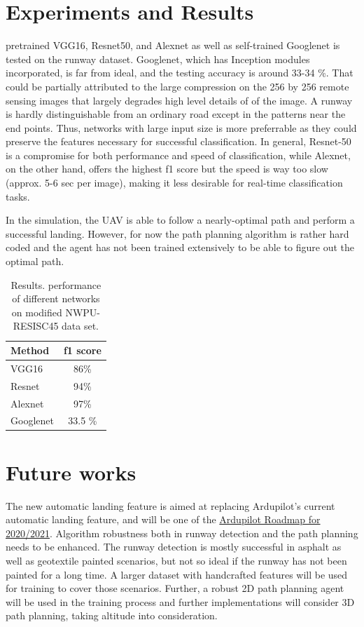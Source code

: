 \documentclass[10pt,twocolumn,letterpaper]{article}
\begin{document}
\section{Experiments and Results}
pretrained VGG16, Resnet50, and Alexnet as well as self-trained Googlenet is tested on the runway dataset. Googlenet, which has Inception modules incorporated, is far from ideal, and the testing accuracy is around 33-34 \%. That could be partially attributed to the large compression on the 256 by 256 remote sensing images that largely degrades high level details of of the image. A runway is hardly distinguishable from an ordinary road except in the patterns near the end points. Thus, networks with large input size is more preferrable as they could preserve the features necessary for successful classification. In general, Resnet-50 is a compromise for both performance and speed of classification, while Alexnet, on the other hand, offers the highest f1 score but the speed is way too slow (approx. 5-6 sec per image), making it less desirable for real-time classification tasks.



In the simulation, the UAV is able to follow a nearly-optimal path and perform a successful landing. However, for now the path planning algorithm is rather hard coded and the agent has not been trained extensively to be able to figure out the optimal path. 

\begin{table}
\begin{center}
\begin{tabular}{|l|c|}
\hline
Method & f1 score\\
\hline\hline
VGG16 & 86\% \\
Resnet & 94\% \\
Alexnet & 97\%\\
Googlenet & 33.5 \%\\
\hline
\end{tabular}
\end{center}
\caption{Results.   performance of different networks on modified NWPU-RESISC45 data set.}
\end{table}

\section{Future works}
The new automatic landing feature is aimed at replacing Ardupilot's current automatic landing feature, and will be one of the \href{https://ardupilot.org/dev/docs/roadmap.html}{Ardupilot Roadmap for 2020/2021}. Algorithm robustness both in runway detection and the path planning needs to be enhanced. The runway detection is mostly successful in asphalt as well as geotextile painted scenarios, but not so ideal if the runway has not been painted for a long time. A larger dataset with handcrafted features will be used for training to cover those scenarios. Further, a robust 2D path planning agent will be used in the training process and further implementations will consider 3D path planning, taking altitude into consideration.
\end{document}
